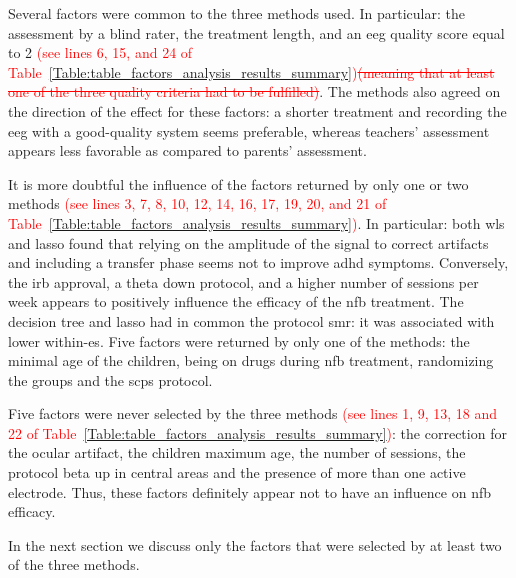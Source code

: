 Several factors were common to the three methods used. In particular: the assessment 
by a blind rater, the treatment length, and an \gls{eeg} quality score equal to 2 \textcolor{red}{(see lines 6, 15, and 24 of 
Table~\ref{Table:table_factors_analysis_results_summary})}\textcolor{red}{\sout{(meaning that at least one of the three quality criteria had to be fulfilled)}}.
The methods also agreed on the direction of the effect for these factors: 
a shorter treatment and recording the \gls{eeg} with a good-quality system seems preferable, whereas teachers' assessment appears less favorable
as compared to parents' assessment.

It is more doubtful the influence of the factors returned by only one or two methods \textcolor{red}{(see lines 3, 7, 8, 10, 12, 14, 
16, 17, 19, 20, and 21 of Table~\ref{Table:table_factors_analysis_results_summary})}. In particular: 
both \gls{wls} and \gls{lasso} found that relying on the amplitude of the signal to correct artifacts and including a transfer 
phase seems not to improve \gls{adhd} symptoms. Conversely, the \gls{irb} approval, a theta down protocol, and a higher number 
of sessions per week appears to positively influence the efficacy of the \gls{nfb} treatment. The decision tree and \gls{lasso} had in common the protocol 
\gls{smr}: it was associated with lower within-\gls{es}. Five factors were returned by only one of the methods: the minimal age of the 
children, being on drugs during \gls{nfb} treatment, randomizing the groups and the \glspl{scp} protocol.  

Five factors were never selected by the three methods \textcolor{red}{(see lines 1, 9, 13, 18 and 22 of 
Table~\ref{Table:table_factors_analysis_results_summary})}: the correction for the ocular artifact, the children maximum age, the number 
of sessions, the protocol beta up in central areas and the presence of more than one active electrode. Thus, these factors definitely appear 
not to have an influence on \gls{nfb} efficacy.  

In the next section we discuss only the factors that were selected by at least two of the three methods. 

